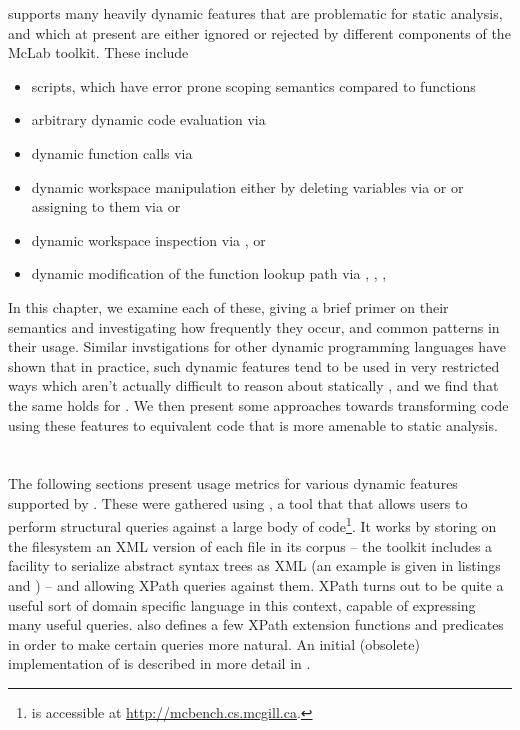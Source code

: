 \matlab supports many heavily dynamic features that are problematic for static
analysis, and which at present are either ignored or rejected by different
components of the McLab toolkit. These include

\begin{itemize}

\item scripts, which have error prone scoping semantics compared to functions

\item arbitrary dynamic code evaluation via 

\item dynamic function calls via 

\item dynamic workspace manipulation either by deleting variables via
 or  or assigning to them via  or

\item dynamic workspace inspection via ,  or 

\item dynamic modification of the function lookup path via ,
, , 

\end{itemize}

In this chapter, we examine each of these, giving a brief primer on their
semantics and investigating how frequently they occur, and common patterns in
their usage. Similar invstigations for other dynamic programming languages have
shown that in practice, such dynamic features tend to be used in very
restricted ways which aren't actually difficult to reason about statically
\cite{TheEvalThatMenDo,ProfileGuidedStaticTyping}, and we find that the same
holds for \matlab. We then present some approaches towards transforming code
using these features to equivalent code that is more amenable to static
analysis.

\section{\mcbench}

The following sections present usage metrics for various dynamic features
supported by \matlab. These were gathered using \mcbench, a tool that that
allows users to perform structural queries against a large body of \matlab
code\footnote{\mcbench is accessible at \url{http://mcbench.cs.mcgill.ca}.}. It
works by storing on the filesystem an XML version of each \matlab file in its
corpus -- the \mclab toolkit includes a facility to serialize \matlab abstract
syntax trees as XML (an example is given in listings 
and ) -- and allowing XPath queries against them. XPath
turns out to be quite a useful sort of domain specific language in this
context, capable of expressing many useful queries. \mcbench also defines a few
XPath extension functions and predicates in order to make certain queries more
natural. An initial (obsolete) implementation of \mcbench is described in more
detail in \cite{SoroushThesis}.


